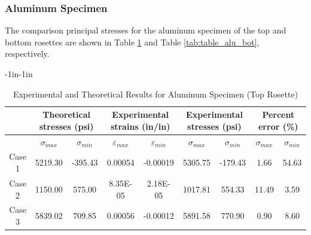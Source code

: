 \documentclass[12pt, titlepage]{article}
\begin{document}
\subsubsection{Aluminum Specimen}
The comparison principal stresses for the aluminum specimen of the top and
bottom rosettes are shown in Table \ref{tab:table_alu_top} and Table
\ref{tab:table_alu_bot}, respectively.
\begin{table}[H]
  \begin{adjustwidth}{-1in}{-1in}
    \begin{tabular}{|c|c|c|c|c|c|c|c|c|} \hline
        & \multicolumn{2}{|c|}{\parbox{4cm}{\centering\textbf{Theoretical stresses (psi)}}} 
        & \multicolumn{2}{|c|}{\parbox{4cm}{\centering\textbf{Experimental strains (in/in)}}} 
        & \multicolumn{2}{|c|}{\parbox{4cm}{\centering\textbf{Experimental stresses (psi)}}} 
        & \multicolumn{2}{|c|}{\parbox{4cm}{\centering\textbf{Percent error (\%)}}} 
        \\ \hline
        & $\sigma_{max}$ & $\sigma_{min}$ & $\varepsilon_{max}$ & $\varepsilon_{min}$ & $\sigma_{max}$ & $\sigma_{min}$ & $\sigma_{max}$ & $\sigma_{min}$ \\ \hline
        Case 1 & 5219.30 & -395.43 & 0.00054 & -0.00019 & 5305.75 & -179.43 & 1.66 & 54.63 \\ \hline
        Case 2 & 1150.00 & 575.00 & 8.35E-05 & 2.18E-05 & 1017.81 & 554.33 & 11.49 & 3.59 \\ \hline
        Case 3 & 5839.02 & 709.85 & 0.00056 & -0.00012 & 5891.58 & 770.90 & 0.90 & 8.60 \\ \hline
    \end{tabular}
  \end{adjustwidth}
  \captionsetup{justification=raggedright,singlelinecheck=false}
  \caption{Experimental and Theoretical Results for Aluminum Specimen (Top Rosette)}
  \label{tab:table_alu_top}
\end{table}
\end{document}
